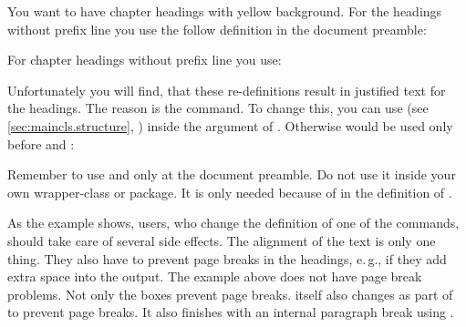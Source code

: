 \begin{Example}
  You want to have chapter headings with yellow background. For the headings
  without prefix line you use the follow definition in the document preamble:
\begin{lstcode}
  \makeatletter
  \renewcommand{\chapterlinesformat}[3]{%
    \colorbox{yellow}{%
      \parbox{\dimexpr\linewidth-2\fboxrule-2\fboxsep}{%
        \@hangfrom{#2}#3%
      }%
    }%
  }
  \makeatother
\end{lstcode}
  For chapter headings without prefix line you use:
\begin{lstcode}
  \renewcommand{\chapterlineswithprefixformat}[3]{%
    \colorbox{yellow}{%
      \parbox{\dimexpr\linewidth-2\fboxrule-2\fboxsep}{%
        #2#3%
      }%
    }%
  }
\end{lstcode}
  Unfortunately you will find, that these re-definitions result in justified
  text for the headings. The reason is the  command. To change
  this, you can use  (see
  \autoref{sec:maincls.structure}, )
  inside the argument of . Otherwise  would
  be used only before  and
  :
\begin{lstcode}
  \makeatletter
  \renewcommand{\chapterlinesformat}[3]{%
    \colorbox{yellow}{%
      \parbox{\dimexpr\linewidth-2\fboxrule-2\fboxsep}{%
        \raggedchapter
        \@hangfrom{#2}#3%
      }%
    }%
  }
  \makeatother
  \renewcommand{\chapterlineswithprefixformat}[3]{%
    \colorbox{yellow}{%
      \parbox{\dimexpr\linewidth-2\fboxrule-2\fboxsep}{%
        \raggedchapter
        #2#3%
      }%
    }%
  }
\end{lstcode}
  Remember to use  and  only at the
  document preamble. Do not use it inside your own wrapper-class or
  package. It is only needed because of  in the definition of
  .
\end{Example}

As the example shows, users, who change the definition of one of the commands,
should take care of several side effects. The alignment of the text is only
one thing. They also have to prevent page breaks in the headings, e.\,g., if
they add extra space into the output. The example above does not have page
break problems. Not only the boxes prevent page breaks. \KOMAScript{} itself
also changes  as part of  to prevent page
breaks. It also finishes  with an internal paragraph break using
.

